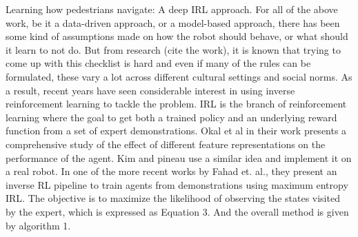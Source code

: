 Learning how pedestrians navigate: A deep IRL approach. 
For all of the above work, be it a data-driven approach, or a model-based approach, there has been some kind of assumptions made on how the robot should behave, or what should it learn to not do. But from research (cite the work), it is known that trying to come up with this checklist is hard and even if many of the rules can be formulated, these vary a lot across different cultural settings and social norms. As a result, recent years have seen considerable interest in using inverse reinforcement learning to tackle the problem. IRL is the branch of reinforcement learning where the goal to get both a trained policy and an underlying reward function from a set of expert demonstrations.
Okal et al in their work presents a comprehensive study of the effect of different feature representations on the performance of the agent.
Kim and pineau use a similar idea and implement it on a real robot. 
In one of the more recent works by Fahad et. al., they present an inverse RL pipeline to train agents from demonstrations using maximum entropy IRL.
The objective is to maximize the likelihood of observing the states visited by the expert, which is expressed as Equation 3.
And the overall method is given by algorithm 1.